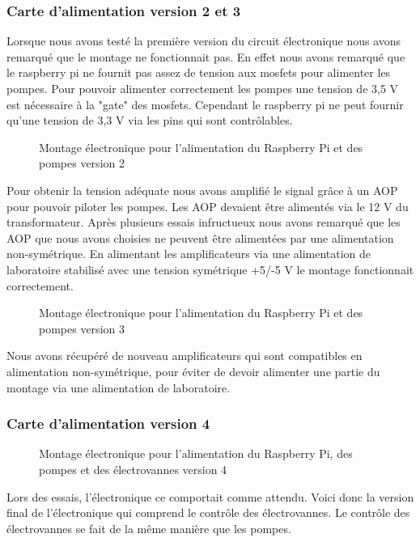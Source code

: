 \documentclass[a4paper, 11pt]{article}
\begin{document}
\subsubsection{Carte d'alimentation version 2 et 3}
Lorsque nous avons testé la première version du circuit électronique nous avons remarqué que le montage ne fonctionnait pas.
En effet nous avons remarqué que le raspberry pi ne fournit pas assez de tension aux mosfets pour alimenter les pompes.
Pour pouvoir alimenter correctement les pompes une tension de 3,5 V est nécessaire à la "gate" des mosfets.
Cependant le raspberry pi ne peut fournir qu'une tension de 3,3 V via les pins qui sont contrôlables.
\begin{figure}[H]
    \centering
    \caption{Montage électronique pour l'alimentation du Raspberry Pi et des pompes version 2}
    \label{fig:CAO_electronique_V2}
\end{figure}
Pour obtenir la tension adéquate nous avons amplifié le signal grâce à un AOP pour pouvoir piloter les pompes.
Les AOP devaient être alimentés via le 12 V du transformateur.
Après plusieurs essais infructueux nous avons remarqué que les AOP que nous avons choisies ne peuvent être alimentées par une alimentation non-symétrique.
En alimentant les amplificateurs via une alimentation de laboratoire stabilisé avec une tension symétrique +5/-5 V le montage fonctionnait correctement.
\begin{figure}[H]
    \centering
    \caption{Montage électronique pour l'alimentation du Raspberry Pi et des pompes version 3}
    \label{fig:CAO_electronique_V3}
\end{figure}
Nous avons récupéré de nouveau amplificateurs qui sont compatibles en alimentation non-symétrique, pour éviter de devoir alimenter une partie du montage via une alimentation de laboratoire.
\subsubsection{Carte d'alimentation version 4}
\begin{figure}[H]
    \centering
    \caption{Montage électronique pour l'alimentation du Raspberry Pi, des pompes et des électrovannes version 4}
    \label{fig:CAO_electronique_V4}
\end{figure}
Lors des essais, l'électronique ce comportait comme attendu. Voici donc la version final de l'électronique qui comprend le contrôle des électrovannes.
Le contrôle des électrovannes se fait de la même manière que les pompes.
\end{document}
